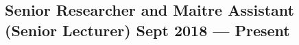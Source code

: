 \documentclass[letter,10pt]{article}
\begin{document}
\subsection{Senior Researcher and Maitre Assistant (Senior Lecturer)  \hfill Sept 2018 --- Present}
\vspace{1cm}

\end{document}
